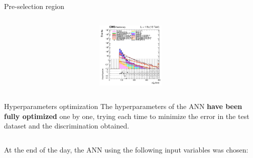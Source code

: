 \documentclass[8pt]{beamer}
\begin{document}
\begin{frame}{Pre-selection region}
\begin{columns}
\begin{column}{0.33\textwidth}
\begin{center}
     			\includegraphics[width=1.0\textwidth, height=90pt]{figs/2018/log_cratio_topCR_ll_mt2ll.png}
    		\end{center}		
		\end{column}
\end{columns} \vfill
\end{frame}

\begin{frame}{Hyperparameters optimization}
\justifying
The hyperparameters of the ANN \textbf{have been fully optimized} one by one, trying each time to minimize the error in the test dataset and the discrimination obtained. \vfill

\begin{columns}
		\begin{column}{0.59\textwidth}
		\begin{table}
\begin{center}
\end{center}
\end{table}
		\end{column} 
		\end{columns} \vfill
		
At the end of the day, the ANN using the following input variables was chosen:


\end{frame}
\end{document}
